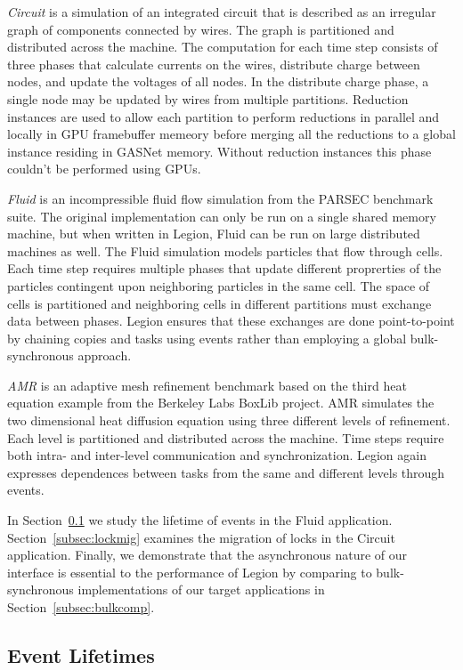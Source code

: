 {\em Circuit} is a simulation of an integrated circuit that is described as an
irregular graph of components connected by wires.  The graph is partitioned
and distributed across the machine.  The computation for each time step consists
of three phases that calculate currents on the wires, distribute charge between
nodes, and update the voltages of all nodes.  In the distribute charge
phase, a single node may be updated by wires from multiple partitions.  Reduction instances 
are used to allow each partition to perform reductions in parallel and locally in GPU
framebuffer memeory before merging all the reductions to a global instance
residing in GASNet memory.  Without reduction instances this phase
couldn't be performed using GPUs.

{\em Fluid} is an incompressible fluid flow simulation from the PARSEC
benchmark suite\cite{bienia11benchmarking}.  The original implementation can 
only be run on a single shared memory machine, but when written in Legion, Fluid can
be run on large distributed machines as well.  The Fluid simulation
models particles that flow through cells.  Each time step requires multiple phases
that update different proprerties of the particles contingent upon neighboring
particles in the same cell.  The space of cells is partitioned and neighboring
cells in different partitions must exchange data between phases.  Legion ensures
that these exchanges are done point-to-point by chaining copies and tasks
using events rather than employing a global bulk-synchronous approach.

{\em AMR} is an adaptive mesh refinement benchmark based on the third heat
equation example from the Berkeley Labs BoxLib project\cite{BoxLib}.  AMR
simulates the two dimensional heat diffusion equation using three different levels
of refinement.  Each level is partitioned and distributed across the machine.  Time steps require
both intra- and inter-level communication and synchronization.  Legion again
expresses dependences between tasks from the same and different levels through
events.

In Section~\ref{subsec:eventlife} we study the lifetime of events in
the Fluid application.  Section~\ref{subsec:lockmig} examines
the migration of locks in the Circuit application.  Finally, we demonstrate
that the asynchronous nature of our interface is essential to the
performance of Legion by comparing to bulk-synchronous
implementations of our target applications in Section~\ref{subsec:bulkcomp}.
  
\subsection{Event Lifetimes}
\label{subsec:eventlife}


